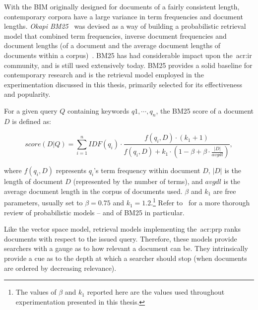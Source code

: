 With the BIM originally designed for documents of a fairly consistent length, contemporary corpora have a large variance in term frequencies and document lengths. \emph{Okapi BM25}~\citep{robertson1995trec3} was devised as a way of building a probabilistic retrieval model that combined term frequencies, inverse document frequencies and document lengths (of a document and the average document lengths of documents within a corpus)~\citep{sparck2000probabilistic}. BM25 has had considerable impact upon the~\gls{acr:ir} community, and is still used extensively today. BM25 provides a solid baseline for contemporary research and is the retrieval model employed in the experimentation discussed in this thesis, primarily selected for its effectiveness and popularity.

For a given query $Q$ containing keywords $q1, \cdots, q_n$, the BM25 score of a document $D$ is defined as:

\begin{equation}
score(D|Q) = \sum_{i=1}^{n} IDF(q_i) \cdot \frac{f(q_i,D)\cdot(k_1 + 1)}{f(q_i,D) + k_1 \cdot (1 - \beta + \beta \cdot \frac{|D|}{avgdl})},
\end{equation}

\noindent
where $f(q_i,D)$ represents $q_i$'s term frequency within document $D$, $|D|$ is the length of document $D$ (represented by the number of terms), and $avgdl$ is the average document length in the corpus of documents used. $\beta$ and $k_1$ are free parameters, usually set to $\beta=0.75$ and $k_1=1.2$.\footnote{The values of $\beta$ and $k_1$ reported here are the values used throughout experimentation presented in this thesis.} Refer to~\cite{robertson2009probabilistic_models} for a more thorough review of probabilistic models -- and of BM25 in particular.

Like the vector space model, retrieval models implementing the~\gls{acr:prp} ranks documents with respect to the issued query. Therefore, these models provide searchers with a gauge as to how relevant a document can be. They intrinsically provide a cue as to the depth at which a searcher should stop (when documents are ordered by decreasing relevance).

